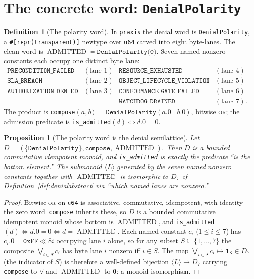 \documentclass[11pt,oneside]{book}
\theoremstyle{definition}
\newtheorem{definition}{Definition}[chapter]
\theoremstyle{plain}
\newtheorem{proposition}[theorem]{Proposition}
\theoremstyle{remark}
\newcommand{\code}[1]{\texttt{#1}}
\newcommand{\Deny}{D}                 %
\newcommand{\Adml}{\operatorname{ADMITTED}}          %
\begin{document}
\section{The concrete word: \texttt{DenialPolarity}}

\begin{definition}[The polarity word]\label{def:denialcode}
In \code{praxis} the denial word is \code{DenialPolarity}, a \code{\#[repr(transparent)]} newtype over \code{u64} carved into eight byte-lanes. %
The clean word is $\Adml=\code{DenialPolarity(0)}$. %
Seven named nonzero constants each occupy one distinct byte lane: %
\[
\begin{array}{llll}
\code{PRECONDITION\_FAILED} & (\text{lane }1) & \code{RESOURCE\_EXHAUSTED} & (\text{lane }4)\\
\code{SLA\_BREACH} & (\text{lane }2) & \code{OBJECT\_LIFECYCLE\_VIOLATION} & (\text{lane }5)\\
\code{AUTHORIZATION\_DENIED} & (\text{lane }3) & \code{CONFORMANCE\_GATE\_FAILED} & (\text{lane }6)\\
& & \code{WATCHDOG\_DRAINED} & (\text{lane }7).
\end{array}
\]
The product is \code{compose}$(a,b)=\code{DenialPolarity}(a.0\mathbin{|}b.0)$, bitwise \textsc{or}; the admission predicate is \code{is\_admitted}$(d)\iff d.0=0$. %
\end{definition}

\begin{proposition}[The polarity word is the denial semilattice]\label{prop:code_is_sl}
Let $\Deny=(\{\code{DenialPolarity}\},\code{compose},\Adml)$. %
Then $\Deny$ is a bounded commutative idempotent monoid, and \code{is\_admitted} is exactly the predicate ``is the bottom element.'' %
The submonoid $\langle L\rangle$ generated by the seven named nonzero constants together with $\Adml$ is isomorphic to $\Deny_7$ of Definition~\ref{def:denialabstract} via ``which named lanes are nonzero.'' %
\end{proposition}

\begin{proof}
Bitwise \textsc{or} on \code{u64} is associative, commutative, idempotent, with identity the zero word; \code{compose} inherits these, so $\Deny$ is a bounded commutative idempotent monoid whose bottom is $\Adml$, and \code{is\_admitted}$(d)\iff d.0=0\iff d=\Adml$. %
Each named constant $c_i$ ($1\le i\le 7$) has $c_i.0=\code{0xFF}\ll 8i$ occupying lane $i$ alone, so for any subset $S\subseteq\{1,\dots,7\}$ the composite $\bigvee_{i\in S}c_i$ has byte lane $i$ nonzero iff $i\in S$. %
The map $\bigvee_{i\in S}c_i\mapsto \bm 1_S\in\Deny_7$ (the indicator of $S$) is therefore a well-defined bijection $\langle L\rangle\to\Deny_7$ carrying \code{compose} to $\lor$ and $\Adml$ to $\bm 0$: a monoid isomorphism. %
\end{proof}
\end{document}
